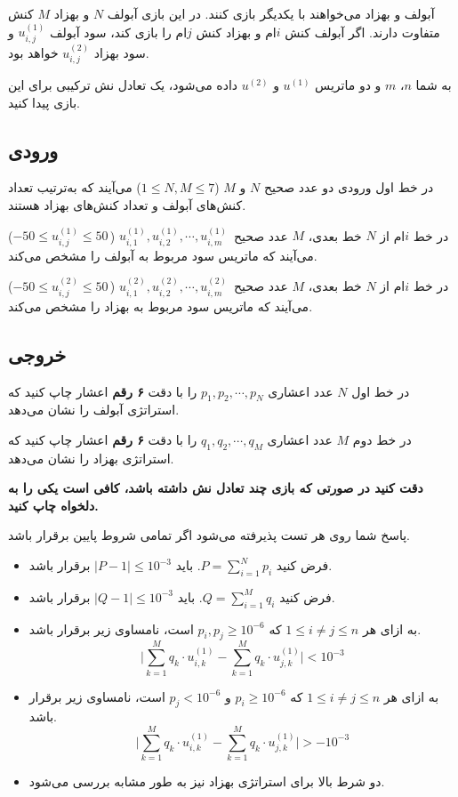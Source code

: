 آبولف و بهزاد می‌خواهند با یکدیگر بازی کنند. در این بازی آبولف $N$ و بهزاد $M$ کنش متفاوت دارند. اگر آبولف کنش $i$ام و بهزاد کنش $j$ام را بازی کند، سود آبولف
$u^{(1)}_{i,j}$
و سود بهزاد
$u^{(2)}_{i,j}$
خواهد بود.

به شما $n$، $m$ و دو ماتریس 
$u^{(1)}$
و 
$u^{(2)}$ 
داده می‌شود، یک تعادل نش ترکیبی برای این بازی پیدا کنید.

\subsection*{ورودی}
در خط اول ورودی دو عدد صحیح $N$ و $M$ 
($1 \leq N, M \leq 7$) 
می‌آیند که به‌ترتیب تعداد کنش‌های آبولف و تعداد کنش‌های بهزاد هستند. 

در خط $i$ام از $N$ خط بعدی، $M$ عدد صحیح 
$u^{(1)}_{i,1}, u^{(1)}_{i,2}, \cdots, u^{(1)}_{i,m} \,$
($-50 \leq u^{(1)}_{i,j} \leq 50 \,$)
می‌آیند که ماتریس سود مربوط به آبولف را مشخص می‌کند.

در خط $i$ام از $N$ خط بعدی، $M$ عدد صحیح 
$u^{(2)}_{i,1}, u^{(2)}_{i,2}, \cdots, u^{(2)}_{i,m} \,$
($-50 \leq u^{(2)}_{i,j} \leq 50 \,$)
می‌آیند که ماتریس سود مربوط به بهزاد را مشخص می‌کند.

\subsection*{خروجی}
در خط اول $N$ عدد اعشاری
$p_1, p_2, \cdots, p_N$
را با دقت \textbf{۶ رقم} اعشار چاپ کنید که استراتژی آبولف را نشان می‌دهد.         

در خط دوم $M$ عدد اعشاری
$q_1, q_2, \cdots, q_M$
را با دقت \textbf{۶ رقم} اعشار چاپ کنید که استراتژی بهزاد را نشان می‌دهد.

\textbf{دقت کنید در صورتی که بازی چند تعادل نش داشته باشد، کافی است یکی را به دلخواه چاپ کنید.}

پاسخ شما روی هر تست پذیرفته می‌شود اگر تمامی شروط پایین برقرار باشد.
\begin{itemize}
\item
فرض کنید
$P = \sum_{i=1}^{N} p_i$. 
باید
$\mid P - 1 \mid \leq 10^{-3}$
برقرار باشد.
\item
فرض کنید
$Q = \sum_{i=1}^{M} q_i$.
باید
$\mid Q - 1 \mid \leq 10^{-3}$
برقرار باشد.
\item
به ازای هر
$1 \leq i \neq j \leq n$
که
$p_i, p_j \geq 10^{-6}$
است، نامساوی زیر برقرار باشد.
$$\mid \sum_{k=1}^{M} q_k \cdot u^{(1)}_{i,k} - \sum_{k=1}^{M} q_k \cdot u^{(1)}_{j,k} \mid < 10^{-3}$$
\item
به ازای هر
$1 \leq i \neq j \leq n$
که
$p_i \geq 10^{-6}$
و
$p_j < 10^{-6}$
است، نامساوی زیر برقرار باشد.
$$\mid \sum_{k=1}^{M} q_k \cdot u^{(1)}_{i,k} - \sum_{k=1}^{M} q_k \cdot u^{(1)}_{j,k} \mid > -10^{-3}$$
\item
دو شرط بالا برای استراتژی بهزاد نیز به طور مشابه بررسی می‌شود.
\end{itemize}
\pagebreak
